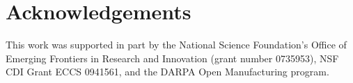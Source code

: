 \section{Acknowledgements}

This work was supported in part by the National Science Foundation's
Office of Emerging Frontiers in Research and Innovation (grant number
0735953), NSF CDI Grant ECCS 0941561, and the DARPA Open Manufacturing
program.
